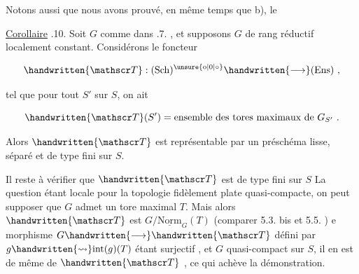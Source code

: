 Notons aussi que nous avons prouvé, en même temps que b), le

\uline{Corollaire} .10. Soit $G$ comme dans .7. , et supposons $G$ de rang réductif localement constant. Considérons le foncteur

\[
\handwritten{\mathscr T}:(\mathrm{Sch})^{\unsure{\mathrm{o}|0|\circ}}\handwritten{\longrightarrow}(\mathrm{Ens})\ ,
\]

tel que pour tout $S'$ sur $S$, on ait

\[
\handwritten{\mathscr T}(S')=\text{ensemble des tores maximaux de }G_{S'}\ .
\]

Alors $\handwritten{\mathscr T}$ est représentable par un préschéma lisse, séparé et de type fini sur $S$.

Il reste à vérifier que $\handwritten{\mathscr T}$ est  de type fini sur $S$ La question étant locale pour la topologie fidèlement plate quasi-compacte, on peut supposer que $G$ admet un tore maximal $T$. Mais alors $\handwritten{\mathscr T}$  est   $G/\underline{\mathrm{Norm}}_G(T)$ (comparer  5.3. bis et 5.5. )  e morphisme $G\handwritten{\longrightarrow}\handwritten{\mathscr T}$ défini par $g\handwritten{\leadsto}\mathrm{int}(g)(T)$ étant surjectif , et $G$ quasi-compact sur $S$, il en est de même de $\handwritten{\mathscr T}$ , ce qui achève la démonstration.

